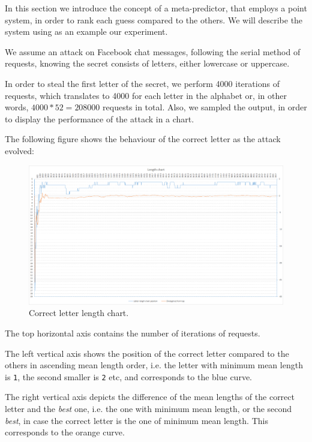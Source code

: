 In this section we introduce the concept of a meta-predictor, that employs a
point system, in order to rank each guess compared to the others. We will
describe the system using as an example our experiment.

We assume an attack on Facebook chat messages, following the serial method of
requests, knowing the secret consists of letters, either lowercase or uppercase.

In order to steal the first letter of the secret, we perform 4000 iterations of
requests, which translates to 4000 for each letter in the alphabet or, in other
words, \begin{math}4000*52=208000\end{math} requests in total. Also, we sampled
the output, in order to display the performance of the attack in a chart.

The following figure shows the behaviour of the correct letter as the attack
evolved:

\begin{figure}[H] \caption{Correct letter length chart.}
\includegraphics[width=1\textwidth]{diagrams/point_system_chart_1.png}\end{figure}

The top horizontal axis contains the number of iterations of requests.

The left vertical axis shows the position of the correct letter compared to the
others in ascending mean length order, i.e. the letter with minimum mean length
is \texttt{1}, the second smaller is \texttt{2} etc, and corresponds to the blue
curve.

The right vertical axis depicts the difference of the mean lengths of the
correct letter and the \textit{best} one, i.e. the one with minimum mean length,
or the second \textit{best}, in case the correct letter is the one of minimum
mean length.  This corresponds to the orange curve.


